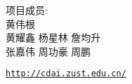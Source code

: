 \documentclass[12pt, notitlepage,
draft
]{ctexbook}
\begin{document}
	\pagestyle{empty}
	
	\cleardoublepage
	\thispagestyle{empty}
	\begin{titlepage}
	\centering
	\noindent
	\center
	\begin{minipage}{\linewidth}
	\fontsize{60}{72}\par
	\vspace{12pt}
	\fontsize{21}{25}\par
	\vspace{8cm}
	\heiti{}
	\raggedright
	项目成员:\\
	
	\vspace*{1em}
	黄伟根\\
	黄耀鑫 \hspace{1em} 杨星林 \hspace{1em} 詹均升 \\
	张嘉伟 \hspace{1em} 周功豪 \hspace{1em} 周鹏 \\
	\end{minipage}
	\vfill
	\par
	\href{http://cdai.zust.edu.cn/}{\texttt{http://cdai.zust.edu.cn/}}
	\end{titlepage}

	\cleardoublepage
	

	\tableofcontents

	\pagestyle{headings}	
	
	
	
\end{document}
